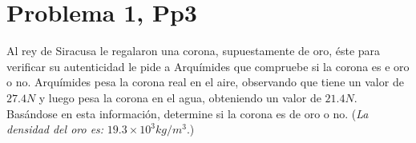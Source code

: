 \section*{Problema 1, Pp3}

Al rey de Siracusa le regalaron una corona, supuestamente de oro, éste para verificar su autenticidad le pide a Arquímides que compruebe si la corona es e oro o no. Arquímides pesa la corona real en el aire, observando que tiene un valor de $27.4N$ y luego pesa la corona en el agua, obteniendo un valor de $21.4N$. Basándose en esta información, determine si la corona es de oro o no. (\textit{La densidad del oro es: } $19.3\times 10^3 kg/m^3$.)







